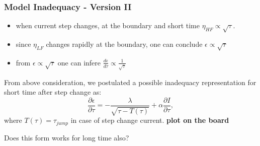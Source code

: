 \documentclass[10pt,xcolor=dvipsnames,compress]{beamer}
\begin{document}
\begin{frame}
\frametitle{Model Inadequacy - Version II}
\vfill

\begin{itemize}
\item when current step changes, at the boundary and short time $\eta_{HF} \propto \sqrt{\tau}$.
\item since $\eta_{LF}$ changes rapidly at the boundary, one can conclude $\epsilon \propto \sqrt{\tau}$
\item from $\epsilon \propto \sqrt{\tau}$ one can infere $\frac{d\epsilon}{d\tau} \propto \frac{1}{\sqrt{\tau}}$
\end{itemize}

From above consideration, we postulated a possible inadequacy representation for short time after step change  as: 
\begin{equation*}
\frac{\partial\epsilon}{\partial\tau} = -\frac{\lambda}{\sqrt{\tau - {T}(\tau)}} + \alpha \frac{\partial I}{\partial\tau},
\end{equation*}
where ${T}(\tau) = \tau_{jump}$ in case of step change current. \textbf{plot on the board}

\begin{center}
Does this form works for long time also?
\end{center}

\vfill
\end{frame}
\end{document}
